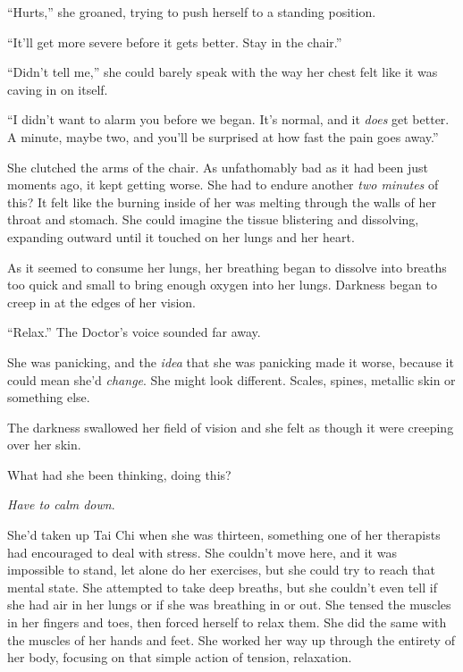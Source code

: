 ``Hurts,'' she groaned, trying to push herself to a standing position.



``It'll get more severe before it gets better.  Stay in the chair.''



``Didn't tell me,'' she could barely speak with the way her chest felt like it was caving in on itself.



``I didn't want to alarm you before we began.  It's normal, and it \emph{does} get better.  A minute, maybe two, and you'll be surprised at how fast the pain goes away.''



She clutched the arms of the chair.  As unfathomably bad as it had been just moments ago, it kept getting worse.  She had to endure another \emph{two minutes} of this?  It felt like the burning inside of her was melting through the walls of her throat and stomach.  She could imagine the tissue blistering and dissolving, expanding outward until it touched on her lungs and her heart.



As it seemed to consume her lungs, her breathing began to dissolve into breaths too quick and small to bring enough oxygen into her lungs.  Darkness began to creep in at the edges of her vision.



``Relax.''  The Doctor's voice sounded far away.



She was panicking, and the \emph{idea} that she was panicking made it worse, because it could mean she'd \emph{change}.  She might look different.  Scales, spines, metallic skin or something else.



The darkness swallowed her field of vision and she felt as though it were creeping over her skin.



What had she been thinking, doing this?



\emph{Have to calm down}.



She'd taken up Tai Chi when she was thirteen, something one of her therapists had encouraged to deal with stress.  She couldn't move here, and it was impossible to stand, let alone do her exercises, but she could try to reach that mental state.  She attempted to take deep breaths, but she couldn't even tell if she had air in her lungs or if she was breathing in or out.  She tensed the muscles in her fingers and toes, then forced herself to relax them.  She did the same with the muscles of her hands and feet.  She worked her way up through the entirety of her body, focusing on that simple action of tension, relaxation.



